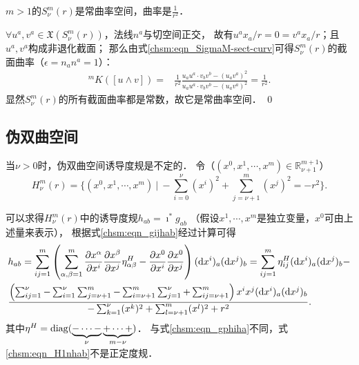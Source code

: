 \begin{example}\label{chsm:exm_SK}
    $m>1$的$S^m_\nu(r)$是常曲率空间，曲率是$\frac{1}{r^2}$．
\end{example}
$\forall u^a,v^a\in \mathfrak{X}(S^m_\nu(r))$，法线$n^a$与切空间正交，
故有$ u^ax_a/r =0 = v^a x_a/r$；且$u^a,v^a$构成非退化截面；
那么由式\eqref{chsm:eqn_SigmaM-sect-curv}可得$S^m_\nu(r)$的截面曲率（$\epsilon=n_a n^a=1$）：
\begin{align*}   
    {}^{m} K([u\wedge v]) 
    =&\frac{1}{r^2}
    \frac{  {u}_a{u}^a \cdot {v}_b{v}^b - ({u}_a{v}^a)^2 }
    {{u}_a{u}^a \cdot {v}_b{v}^b - ({u}_a{v}^a)^2 }
    =\frac{1}{r^2} .
\end{align*}
显然$S^m_\nu(r)$的所有截面曲率都是常数，故它是常曲率空间．
\qed


\subsection{伪双曲空间}\label{chsm:sec_hyperbolic-H1n}
当$\nu>0$时，伪双曲空间诱导度规是不定的．
令（$(x^0,x^1,\cdots,x^{m})\in \mathbb{R}^{m+1}_{\nu+1}$）
\begin{equation}\label{chsm:eqn_hyperbolic-H1n} 
    H^m_{\nu}(r) =  \bigl\{(x^0,x^1,\cdots,x^{m})\ |\  
    -\sum_{i=0}^{\nu} (x^i)^2+\sum_{j=\nu+1}^{m} (x^j)^2 = -r^2 \bigr\} . 
\end{equation} 


可以求得$H^m_{\nu}(r)$中的诱导度规$h_{ab}=\imath ^* g_{ab}$
（假设$x^1,\cdots,x^{m}$是独立变量，$x^0$可由上述量来表示），
根据式\eqref{chsm:eqn_gijhab}经过计算可得
\setlength{\mathindent}{0em}
\begin{align}
    &h_{ab}= \sum_{ij=1}^{m}\left(\sum_{\alpha,\beta=1}^{m}\frac{\partial x^\alpha}{\partial x^i}
    \frac{\partial x^\beta}{\partial x^j}\eta^H_{\alpha\beta} 
    -\frac{\partial x^0}{\partial x^i}  \frac{\partial x^0}{\partial x^j} \right) 
    ({\rm d} x^i)_a ({\rm d} x^j)_b  
    = \sum_{ij=1}^{m} \eta^H_{ij} ({\rm d} x^i)_a ({\rm d} x^j)_b - \notag \\
    &\frac{ \left(\sum_{ij=1}^{\nu}  - \sum_{i=1}^{\nu}\sum_{j=\nu+1}^{m}
        -\sum_{i=\nu+1}^{m}\sum_{j=1}^{\nu} +\sum_{ij=\nu+1}^{m} \right)
        x^i x^j ({\rm d} x^i)_a ({\rm d} x^j)_b }
    {-\sum_{k=1}^{\nu}(x^k)^2+\sum_{l=\nu+1}^{m}(x^l)^2 + r^2}  . \label{chsm:eqn_H1nhab}
\end{align}\setlength{\mathindent}{2em}
其中$\eta^H={\rm diag}(\underbrace{-\cdots-}_{\nu} \underbrace{+\cdots+}_{m-\nu})$．
与式\eqref{chsm:eqn_gphiha}不同，式\eqref{chsm:eqn_H1nhab}不是正定度规．




